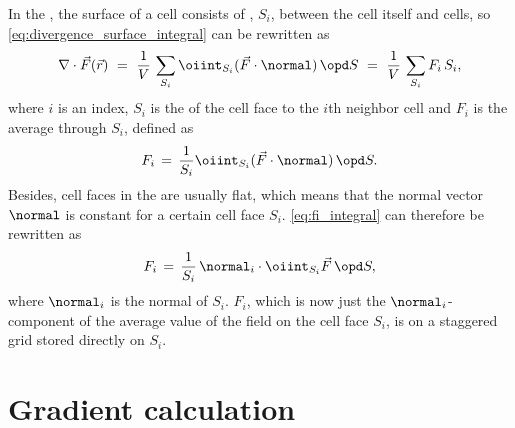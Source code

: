 In the \FVM, the surface of a cell consists of , $S_i$, between the cell itself and \neighboring cells, so \eqref{eq:divergence_surface_integral} can be rewritten as
%
\begin{equation} \label{eq:divergence_cell_face_sum}
\nabla\cdot\vec{F}(\vec{r})\ =\ \frac{1}{V}\,\sum_{S_i} \oiint_{S_i}(\vec{F}\cdot\normal)\,\opd S\ =\ \frac{1}{V}\,\sum_{S_i} F_i\,S_i,
\end{equation}
%
where $i$ is an index, $S_i$ is the \area of the cell face to the $i$th neighbor cell and $F_i$ is the average  through $S_i$, defined as
%
\begin{equation} \label{eq:fi_integral}
F_i \,=\, \frac{1}{S_i}\oiint_{S_i}(\vec{F}\cdot\normal)\,\opd S.
\end{equation}
%
Besides, cell faces in the \FVM are usually flat, which means that the normal vector $\normal$ is constant for a certain cell face $S_i$. \eqref{eq:fi_integral} can therefore be rewritten as
%
\begin{equation} \label{eq:fi_flat_cell_face}
F_i \,=\, \frac{1}{S_i}\,\normal_i\cdot\oiint_{S_i}\vec{F}\,\opd S,
\end{equation}
%
where $\normal_i$ is the normal of $S_i$. $F_i$, which is now just the $\normal_i$-component of the average value of the field on the cell face $S_i$, is on a staggered grid stored directly on $S_i$.

\section{Gradient calculation}

